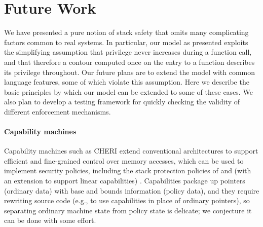 \documentclass[acmsmall,review,anonymous]{acmart}\settopmatter{printfolios=true,printccs=false,printacmref=false}
\begin{document}
{\section{Future Work}
  \label{sec:future}

  We have presented a pure notion of stack safety that omits many complicating
  factors common to real systems. In particular, our model as presented exploits
  the simplifying assumption that privilege never increases during a function
  call, and that therefore a contour computed once on the entry to a function
  describes its privilege throughout. Our future plans are to extend the model
  with common language features, some of which violate this assumption. Here we
  describe the basic principles by which our model can be extended to some of
  these cases. We also plan to develop a testing framework for quickly
  checking the validity of different enforcement mechanisms.

  \paragraph*{Capability machines}
  Capability machines such as CHERI \citep{Woodruff+14} extend conventional
  architectures to support efficient and fine-grained control over memory
  accesses, which can be used to implement security policies, including
  the stack protection policies of
  \citet{Skorstengaard+19b} and (with an extension to support linear capabilities) \citet{Skorstengaard+19}.
  Capabilities package up pointers
  (ordinary data) with base and bounds information (policy data),
  and they require rewriting source code (e.g., to use capabilities in place
  of ordinary pointers), so separating ordinary machine state from policy
  state is delicate; we conjecture it can be done with some effort.


}
\end{document}
